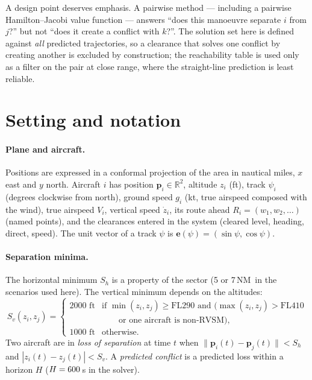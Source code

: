 \documentclass[11pt,a4paper]{article}
\newcommand{\R}{\mathbb{R}}
\newcommand{\Sh}{S_h}
\newcommand{\Sv}{S_v}
\newcommand{\NM}{\ensuremath{\,\mathrm{NM}}}
\begin{document}
A design point deserves emphasis. A pairwise method --- including a pairwise Hamilton--Jacobi value function ---
answers ``does this manoeuvre separate $i$ from $j$?'' but not ``does it create a conflict with $k$?''. The solution
set here is defined against \emph{all} predicted trajectories, so a clearance that solves one conflict by creating
another is excluded by construction; the reachability table is used only as a filter on the pair at close range,
where the straight-line prediction is least reliable.

\section{Setting and notation}\label{sec:setting}

\paragraph{Plane and aircraft.} Positions are expressed in a conformal projection of the area in nautical miles,
$x$ east and $y$ north. Aircraft $i$ has position $\bm p_i\in\R^2$, altitude $z_i$ (ft), track $\psi_i$ (degrees
clockwise from north), ground speed $g_i$ (kt, true airspeed composed with the wind), true airspeed $V_i$,
vertical speed $\dot z_i$, its route ahead $R_i=(w_1,w_2,\dots)$ (named points), and the clearances entered in the
system (cleared level, heading, direct, speed). The unit vector of a track $\psi$ is
$\bm e(\psi) = (\sin\psi,\cos\psi)$.

\paragraph{Separation minima.} The horizontal minimum $\Sh$ is a property of the sector (5 or 7\NM\ in the
scenarios used here). The vertical minimum depends on the altitudes:
\begin{equation}\label{eq:sv}
\Sv(z_i,z_j) = \begin{cases}
2000\text{ ft} & \text{if } \min(z_i,z_j)\ge \mathrm{FL}290 \text{ and } \big(\max(z_i,z_j) > \mathrm{FL}410\\
 & \qquad\text{or one aircraft is non-RVSM}\big),\\
1000\text{ ft} & \text{otherwise.}
\end{cases}
\end{equation}
Two aircraft are in \emph{loss of separation} at time $t$ when
$\|\bm p_i(t)-\bm p_j(t)\| < \Sh$ and $|z_i(t)-z_j(t)| < \Sv$. A \emph{predicted conflict} is a predicted loss
within a horizon $H$ ($H = 600$\,s in the solver).
\end{document}
